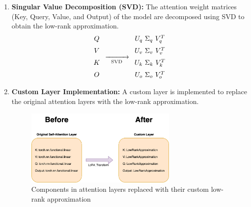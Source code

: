        \begin{enumerate}
            \item \textbf{Singular Value Decomposition (SVD):} The attention weight matrices (Key, Query, Value, and Output) of the model are decomposed using SVD to obtain the low-rank approximation.
            \[
            \begin{array}{c}
                Q \\[0.2cm] %
                V \\[0.2cm] %
                K \\[0.2cm]
                O
            \end{array}
            \xrightarrow[\text{SVD}]{\hspace*{1cm}}
            \begin{array}{c}
                U_q \ \Sigma_q \ V_q^T \\[0.2cm] %
                U_v \ \Sigma_v \ V_v^T \\[0.2cm] %
                U_k \ \Sigma_k \ V_k^T \\[0.2cm]
                U_o \ \Sigma_o \ V_o^T

            \end{array}
            \]

            \item \textbf{Custom Layer Implementation:} A custom layer is implemented to replace the original attention layers with the low-rank approximation.
            \begin{figure}[H]
                \centering
                \includegraphics[width=0.7\textwidth]{figs/before-after.png}
                \caption{Components in attention layers replaced with their custom low-rank approximation}
                \label{fig:lora_implementation}
            \end{figure}
        \end{enumerate}
        
